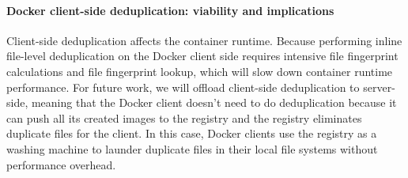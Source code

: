 \paragraph{Docker client-side deduplication: viability and implications}
Client-side deduplication affects the container runtime. 
Because performing inline file-level deduplication on the Docker client side requires intensive file 
fingerprint calculations and file fingerprint lookup, which will slow down container runtime performance.
For future work, we will offload client-side deduplication to server-side, meaning that the 
Docker client doesn't need to do deduplication because
it can push all its created images to the registry and the registry eliminates duplicate files for the client. 
In this case, Docker clients use the registry as a washing machine to launder duplicate files in their local file systems without performance overhead.


%
%
%

